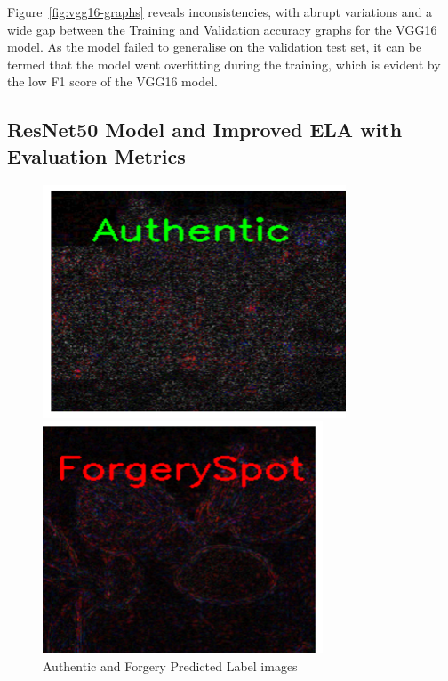 \documentclass{ieeeaccess}
\begin{document}
  Figure~\ref{fig:vgg16-graphs} reveals inconsistencies, with abrupt variations and a wide gap between the Training and Validation accuracy graphs for the VGG16 model. As the model failed to generalise on the validation test set, it can be termed that the model went overfitting during the training, which is evident by the low F1 score of the VGG16 model.
  
  \subsection{ResNet50 Model and Improved ELA with Evaluation Metrics}
    \begin{figure}[h!]
  	\centering
  	\begin{minipage}{0.23\textwidth}
  		\centering
  		\includegraphics[width=\linewidth]{Authentic_img.png}
  	\end{minipage}
  	\hfill
  	\begin{minipage}{0.21\textwidth}
  		\centering
  		\includegraphics[width=\linewidth]{Forgery_img.png}
  		
  	\end{minipage}
  	\caption{Authentic and Forgery Predicted Label images}
  	\label{fig:Authentic_and_ELA}
  \end{figure}
  
\end{document}

